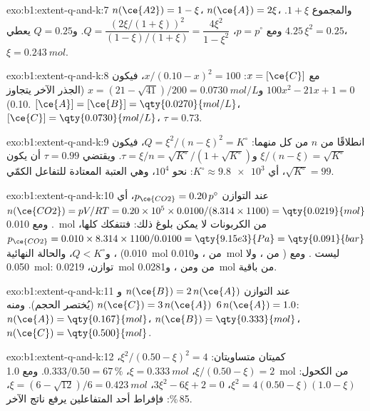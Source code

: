\begin{solution}{exo:b1:extent-q-and-k:7}
$n(\ce{A2}) = 1 - \xi$، $n(\ce{A}) = 2\xi$، والمجموع $1 + \xi$. ومع $p =
p^\circ$، $Q = \dfrac{(2\xi/(1+\xi))^2}{(1-\xi)/(1+\xi)} = \dfrac{4\xi^2}{1 -
\xi^2}$. و$Q = 0.25$ يعطي $4.25\,\xi^2 = 0.25$، $\xi = \qty{0.243}{mol}$.
\end{solution}

\begin{solution}{exo:b1:extent-q-and-k:8}
مع $x = [\ce{C}]$: $x/(0.10 - x)^2 = 100$، فيكون $100x^2 - 21x + 1 = 0$
و$x = (21 - \sqrt{41})/200 = \qty{0.0730}{mol/L}$ (الجذر الآخر يتجاوز
0.10). $[\ce{A}] = [\ce{B}] = \qty{0.0270}{mol/L}$، $[\ce{C}] =
\qty{0.0730}{mol/L}$، $\tau = 0.73$.
\end{solution}

\begin{solution}{exo:b1:extent-q-and-k:9}
انطلاقًا من $n$ من كل منهما: $Q = \xi^2/(n - \xi)^2 = K^\circ$، فيكون $\xi/(n - \xi) =
\sqrt{K^\circ}$ و$\tau = \xi/n = \sqrt{K^\circ}/(1 + \sqrt{K^\circ})$.
ويقتضي $\tau = 0.99$ أن يكون $\sqrt{K^\circ} = 99$، أي $K^\circ \approx \num{9.8e3}$:
نحو $10^4$، وهي العتبة المعتادة للتفاعل الكمّي.
\end{solution}

\begin{solution}{exo:b1:extent-q-and-k:10}
عند التوازن $p_{\ce{CO2}} = 0.20\,p^\circ$، أي $n(\ce{CO2}) =
pV/RT = 0.20 \times 10^5 \times 0.0100/(8.314 \times 1100) =
\qty{0.0219}{mol}$. ومع \qty{0.010}{mol} من الكربونات لا يمكن بلوغ ذلك:
فتتفكك كلها، $p_{\ce{CO2}} = 0.010 \times 8.314 \times
1100/0.0100 = \qty{9.15e3}{Pa} = \qty{0.091}{bar}$، و$Q < K^\circ$،
والحالة النهائية (\qty{0.010}{mol} من ، و\qty{0.010}{mol} من ، ولا
) ليست . ومع \qty{0.050}{mol}: توازن،
\qty{0.0219}{mol} من  ومن ، و\qty{0.0281}{mol} من  باقية.
\end{solution}

\begin{solution}{exo:b1:extent-q-and-k:11}
عند التوازن $n(\ce{B}) = 2\,n(\ce{A})$ و$n(\ce{C}) = 3\,n(\ce{A})$
(يُختصر الحجم). ومنه $6\,n(\ce{A}) = 1.0$: $n(\ce{A}) =
\qty{0.167}{mol}$، $n(\ce{B}) = \qty{0.333}{mol}$، $n(\ce{C}) =
\qty{0.500}{mol}$.
\end{solution}

\begin{solution}{exo:b1:extent-q-and-k:12}
كميتان متساويتان: $\xi^2/(0.50 - \xi)^2 = 4$، $\xi/(0.50 - \xi) = 2$،
$\xi = \qty{0.333}{mol}$،  $0.333/0.50 = 67\,\%$. ومع \qty{1.0}{mol}
من الكحول: $\xi^2 = 4(0.50 - \xi)(1.0 - \xi)$، $3\xi^2 - 6\xi + 2 = 0$،
$\xi = (6 - \sqrt{12})/6 = \qty{0.423}{mol}$،  85\,\%: فإفراط
أحد المتفاعلين يرفع  ناتج الآخر.
\end{solution}

